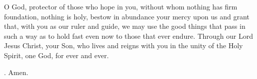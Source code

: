 \lettrine[lines=3]{O}{} God, protector of those who hope in you,
without whom nothing has firm foundation, nothing is holy,
bestow in abundance your mercy upon us
and grant that, with you as our ruler and guide,
we may use the good things that pass
in such a way as to hold fast even now to those that ever endure.
Through our Lord Jesus Christ, your Son,
who lives and reigns with you in the unity of the Holy Spirit,
one God, for ever and ever. \par \Rbar. Amen.
